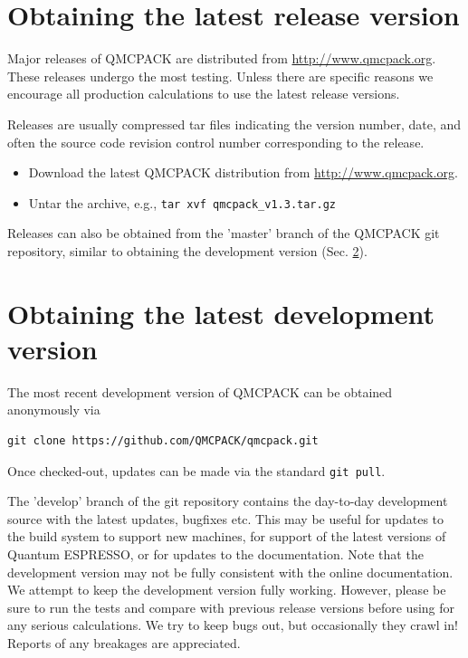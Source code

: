 \section{Obtaining the latest release version}
\label{sec:obrelease}
Major releases of QMCPACK are distributed from
\url{http://www.qmcpack.org}. These releases undergo the most testing. Unless there are
specific reasons we encourage all production calculations to use the
latest release versions.

Releases are usually compressed tar files indicating the version
number, date, and often the source code revision control number
corresponding to the release.

\begin{itemize}
\item Download the latest QMCPACK distribution from \url{http://www.qmcpack.org}.
\item Untar the archive, e.g., \texttt{tar xvf qmcpack\_v1.3.tar.gz}
\end{itemize}

Releases can also be obtained from the 'master' branch of the QMCPACK
git repository, similar to obtaining the development version (Sec. \ref{sec:obdevelopment}).

\section{Obtaining the latest development version}
\label{sec:obdevelopment}
The most recent development version of QMCPACK can be obtained anonymously via
\verbatimfont{\footnotesize}
\begin{verbatim}
git clone https://github.com/QMCPACK/qmcpack.git
\end{verbatim}
Once checked-out,
updates can be made via the standard \texttt{git pull}.

The 'develop' branch of the git repository contains the day-to-day development source
with the latest updates, bugfixes etc. This may be useful
for updates to the build system to support new machines, for support
of the latest versions of Quantum ESPRESSO, or for updates to the
documentation.  Note that the development version may not be fully
consistent with the online documentation.  We attempt to keep
the development version fully working. However, please be sure to run the tests and
compare with previous release versions before using for any serious
calculations. We try to keep bugs out, but occasionally they crawl
in! Reports of any breakages are appreciated.

